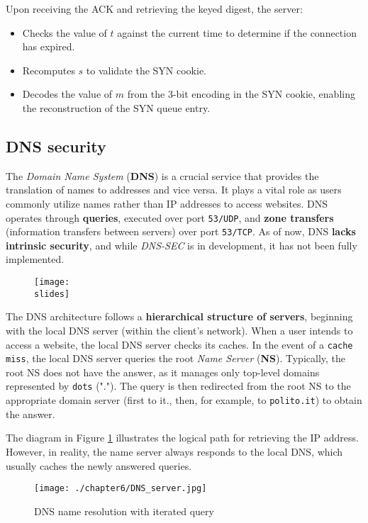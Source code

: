 Upon receiving the ACK and retrieving the keyed digest, the server:

\begin{itemize}
    \item Checks the value of $t$ against the current time to determine if the connection has expired.
    \item Recomputes $s$ to validate the SYN cookie.
    \item Decodes the value of $m$ from the 3-bit encoding in the SYN cookie, enabling the reconstruction of the SYN queue entry.
\end{itemize}


\subsection{DNS security}
The \textit{Domain Name System} (\textbf{DNS}) is a crucial service that provides the translation of names to addresses and vice versa. It plays a vital role as users commonly utilize names rather than IP addresses to access websites. DNS operates through \textbf{queries}, executed over port \texttt{53/UDP}, and \textbf{zone transfers} (information transfers between servers) over port \texttt{53/TCP}. As of now, DNS \textbf{lacks intrinsic security}, and while \textit{DNS-SEC} is in development, it has not been fully implemented.
\begin{figure}[h]
    \centering
    \texttt{[image: \\slides]}
\end{figure}

The DNS architecture follows a \textbf{hierarchical structure of servers}, beginning with the local DNS server (within the client's network). When a user intends to access a website, the local DNS server checks its caches. In the event of a \texttt{cache miss}, the local DNS server queries the root \textit{Name Server} (\textbf{NS}). Typically, the root NS does not have the answer, as it manages only top-level domains represented by \texttt{dots} ("."). The query is then redirected from the root NS to the appropriate domain server (first to it., then, for example, to \texttt{polito.it}) to obtain the answer.

The diagram in Figure \ref*{fig:DNS-server} illustrates the logical path for retrieving the IP address. However, in reality, the name server always responds to the local DNS, which usually caches the newly answered queries.

\begin{figure}[h]
    \centering
    \texttt{[image: ./chapter6/DNS\_server.jpg]}
    \caption{DNS name resolution with iterated query}
    \label{fig:DNS-server}
\end{figure}


